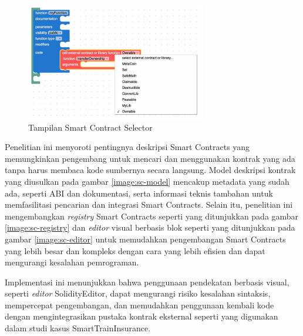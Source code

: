\begin{figure}[ht]
  \centering
  \includegraphics[width=0.7\textwidth]{resources/chapter-2/sc-editor-edit.png}
  \caption{Tampilan Smart Contract Selector \parencite{guida2019supporting}}
  \label{image:sc-editor-edit}
\end{figure}

\break

Penelitian ini menyoroti pentingnya deskripsi Smart Contracts yang memungkinkan pengembang untuk mencari dan menggunakan kontrak yang ada tanpa harus membaca kode sumbernya secara langsung. Model deskripsi kontrak yang diusulkan pada gambar \ref{image:sc-model} mencakup metadata yang sudah ada, seperti ABI dan dokumentasi, serta informasi teknis tambahan untuk memfasilitasi pencarian dan integrasi Smart Contracts. Selain itu, penelitian ini mengembangkan \textit{registry} Smart Contracts seperti yang ditunjukkan pada gambar \ref{image:sc-registry} dan \textit{editor} visual berbasis blok seperti yang ditunjukkan pada gambar \ref{image:sc-editor} untuk memudahkan pengembangan Smart Contracts yang lebih besar dan kompleks dengan cara yang lebih efisien dan dapat mengurangi kesalahan pemrograman.

\break

Implementasi ini menunjukkan bahwa penggunaan pendekatan berbasis visual, seperti \textit{editor} SolidityEditor, dapat mengurangi risiko kesalahan sintaksis, mempercepat pengembangan, dan memudahkan penggunaan kembali kode dengan mengintegrasikan pustaka kontrak eksternal seperti yang digunakan dalam studi kasus SmartTrainInsurance.
